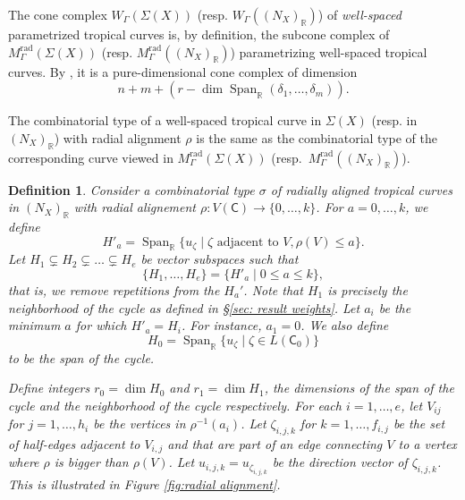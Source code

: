\documentclass{article}
\def\R{\mathbb{R}}
\newtheorem{definition}{Definition}[section]
\newcommand{\tropC}{\mathsf{C}}
\newcommand{\rad}{\mathrm{rad}}
\newcommand{\Span}{\operatorname{Span}_{\mathbb{R}}}
\begin{document}
    The cone complex $W_\Gamma(\Sigma(X))$ (resp. $W_\Gamma((N_X)_{\mathbb{R}})$) of \emph{well-spaced} parametrized tropical curves is, by definition, the subcone complex of $M^{\rad}_\Gamma(\Sigma(X))$ (resp. $M^{\rad}_\Gamma((N_X)_{\mathbb{R}})$) parametrizing well-spaced tropical curves. By \cite[Theorem 3.2.10]{Tor14}, it is a pure-dimensional cone complex of dimension
    $$n+ m+ (r - \dim \Span(\delta_1, \ldots, \delta_m)).$$

    The combinatorial type of a well-spaced tropical curve in $\Sigma(X)$ (resp. in $(N_X)_\R$) with radial alignment $\rho$ is the same as the combinatorial type of the corresponding curve viewed in $M^{\rad}_{\Gamma}(\Sigma(X))$ (resp.~$M^{\rad}_{\Gamma}((N_X)_\R)$).
    
    \begin{definition} \label{def: filtration}
    Consider a combinatorial type $\sigma$ of radially aligned tropical curves in $(N_X)_{\mathbb{R}}$ with radial alignement $\rho: V(\tropC) \rightarrow \{ 0, \ldots, k\}$. For $a = 0, \ldots, k$, we define
    $$H'_a = \Span \{ u_{\zeta} \mid \zeta \text{ adjacent to } V, \rho(V) \leq a \}.$$
    Let $H_1 \subsetneq H_2 \subsetneq \ldots \subsetneq H_{e}$ be vector subspaces such that
    $$\{H_1, \ldots, H_e\} = \{H'_a \mid 0 \leq a \leq k\},$$
    that is, we remove repetitions from the $H_a'$. Note that $H_1$ is precisely the neighborhood of the cycle as defined in \S\ref{sec: result weights}.
    Let $a_i$ be the minimum $a$ for which $H'_a = H_i$. For instance, $a_1=0$.
    We also define 
    $$H_0 = \Span \{u_{\zeta} \mid \zeta \in L(\tropC_0)\}$$ 
    to be the span of the cycle. 
    
    
    
    Define integers $r_0 = \dim H_0$ and $r_1 = \dim H_1$, the dimensions of the span of the cycle and the neighborhood of the cycle respectively. 
    For each $i = 1, \ldots, e$, let $V_{ij}$ for $j =1 , \ldots, h_i$ be the vertices in $\rho^{-1}(a_i)$. Let $\zeta_{i,j,k}$ for $k = 1, \ldots, f_{i,j}$ be the set of half-edges adjacent to $V_{i,j}$ and that are part of an edge connecting $V$ to a vertex where $\rho$ is bigger than $\rho(V)$. Let $u_{i,j,k} = u_{\zeta_{i,j,k}}$ be the direction vector of $\zeta_{i,j,k}$. This is illustrated in Figure \ref{fig:radial alignment}. 
    
    \begin{figure}[h]
        \centering
\end{figure}
\end{definition}
\end{document}

